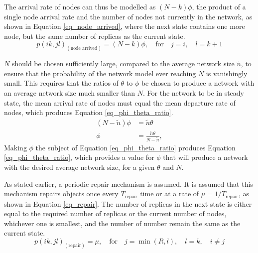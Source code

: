\documentclass[10pt,a4paper,conference]{IEEEtran}
\begin{document}
The arrival rate of nodes can thus be modelled as $(N - k)\phi$, the product of a single node arrival rate and the number of nodes not currently in the network, as shown in Equation \eqref{eq_node_arrived}, where the next state contains one more node, but the same number of replicas as the current state.
%
\begin{equation} \label{eq_node_arrived}
    p(i k,j l)_{(\textrm{node arrived})} = (N - k)\phi,\quad\textrm{for}\quad j = i,\quad l = k + 1
\end{equation}


$N$ should be chosen sufficiently large, compared to the average network size $\tilde{n}$, to ensure that the probability of the network model ever reaching $N$ is vanishingly small. This requires that the ratios of $\theta$ to $\phi$ be chosen to produce a network with an average network size much smaller than $N$. For the network to be in steady state, the mean arrival rate of nodes must equal the mean departure rate of nodes, which produces Equation \eqref{eq_phi_theta_ratio}.
%
\begin{align}
    (N - \tilde{n})\phi &= \tilde{n}\theta\label{eq_phi_theta_ratio}\\
    \phi &= \frac{\tilde{n}\theta}{N - \tilde{n}},
\end{align}
%
Making $\phi$ the subject of Equation \eqref{eq_phi_theta_ratio} produces Equation \eqref{eq_phi_theta_ratio}, which provides a value for $\phi$ that will produce a network with the desired average network size, for a given $\theta$ and $N$.

As stated earlier, a periodic repair mechanism is assumed. It is assumed that this mechanism repairs objects once every $T_{\textrm{repair}}$ time or at a rate of $\mu = 1/T_{\textrm{repair}}$, as shown in Equation \ref{eq_repair}. The number of replicas in the next state is either equal to the required number of replicas or the current number of nodes, whichever one is smallest, and the number of number remain the same as the current state.
%
\begin{equation} \label{eq_repair}
    p(i k,j l)_{(\textrm{repair})} = \mu,\quad\textrm{for}\quad j = \min(R, l),\quad l = k,\quad i \neq j
\end{equation}
\end{document}
